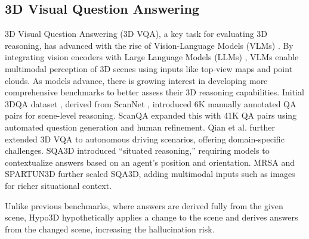 \subsection{3D Visual Question Answering}
3D Visual Question Answering (3D VQA), a key task for evaluating 3D reasoning, has advanced with the rise of Vision-Language Models (VLMs) \cite{hong20233d, liu2024visual, anthroptic2024claude3.5sonnet}. By integrating vision encoders with Large Language Models (LLMs) \cite{peng2023instruction,bai2023qwen}, VLMs enable multimodal perception of 3D scenes using inputs like top-view maps and point clouds. As models advance, there is growing interest in developing more comprehensive benchmarks to better assess their 3D reasoning capabilities. Initial 3DQA dataset \cite{ye20213d}, derived from ScanNet \cite{dai2017scannet}, introduced 6K manually annotated QA pairs for scene-level reasoning. ScanQA \cite{azuma2022scanqa} expanded this with 41K QA pairs using automated question generation and human refinement. Qian et al. \cite{qian2024nuscenes} further extended 3D VQA to autonomous driving scenarios, offering domain-specific challenges. SQA3D \cite{ma2022sqa3d} introduced “situated reasoning,” requiring models to contextualize answers based on an agent’s position and orientation. MRSA \cite{linghu2024multi} and SPARTUN3D \cite{zhang2024spartun3d} further scaled SQA3D, adding multimodal inputs such as images for richer situational context. 

Unlike previous benchmarks, where answers are derived fully from the given scene, Hypo3D hypothetically applies a change to the scene and derives answers from the changed scene, increasing the hallucination risk.